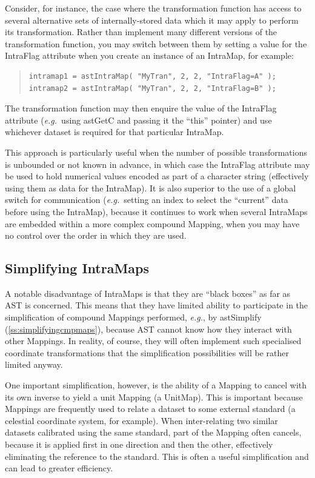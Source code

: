 \documentclass[twoside,11pt]{article}
\newcommand{\htmlref}[2]{#1}
\newcommand{\xlabel}[1]{}
\newcommand{\secref}[1]{\S\ref{#1}}
\renewcommand{\secref}[1]{\ref{#1}}
\begin{document}
Consider, for instance, the case where the transformation function has
access to several alternative sets of internally-stored data which it
may apply to perform its transformation. Rather than implement many
different versions of the transformation function, you may switch
between them by setting a value for the IntraFlag attribute when you
create an instance of an IntraMap, for example:

\begin{quote}
\small
\begin{verbatim}
intramap1 = astIntraMap( "MyTran", 2, 2, "IntraFlag=A" );
intramap2 = astIntraMap( "MyTran", 2, 2, "IntraFlag=B" );
\end{verbatim}
\normalsize
\end{quote}

The transformation function may then enquire the value of the IntraFlag
attribute ({\em{e.g.}}\ using astGetC and passing it the ``this''
pointer) and use whichever dataset is required for that particular
IntraMap.

This approach is particularly useful when the number of possible
transformations is unbounded or not known in advance, in which case
the IntraFlag attribute may be used to hold numerical values encoded
as part of a character string (effectively using them as data for the
IntraMap). It is also superior to the use of a global switch for
communication ({\em{e.g.}}\ setting an index to select the ``current''
data before using the IntraMap), because it continues to work when
several IntraMaps are embedded within a more complex compound \htmlref{Mapping}{Mapping},
when you may have no control over the order in which they are used.

\subsection{\xlabel{MaxTran}\label{ss:simplifyingintramaps}Simplifying IntraMaps}

A notable disadvantage of IntraMaps is that they are ``black boxes''
as far as AST is concerned. This means that they have limited ability
to participate in the simplification of compound Mappings performed,
{\em{e.g.}}, by \htmlref{astSimplify}{astSimplify} (\secref{ss:simplifyingcmpmaps}), because
AST cannot know how they interact with other Mappings. In reality, of
course, they will often implement such specialised coordinate
transformations that the simplification possibilities will be rather
limited anyway.

One important simplification, however, is the ability of a \htmlref{Mapping}{Mapping} to
cancel with its own inverse to yield a unit Mapping (a \htmlref{UnitMap}{UnitMap}). This
is important because Mappings are frequently used to relate a dataset
to some external standard (a celestial coordinate system, for
example). When inter-relating two similar datasets calibrated using
the same standard, part of the Mapping often cancels, because it is
applied first in one direction and then the other, effectively
eliminating the reference to the standard. This is often a useful
simplification and can lead to greater efficiency.
\end{document}
